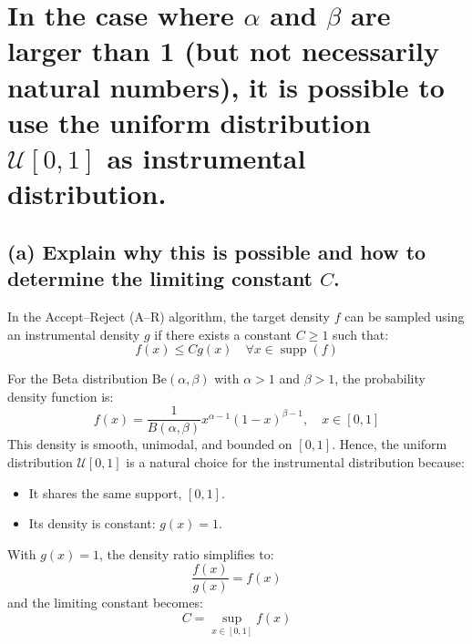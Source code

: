 \newpage


\section{In the case where $\alpha$ and $\beta$ are larger than 1 (but not necessarily natural numbers), it is possible to use the uniform distribution $\mathcal{U}[0, 1]$ as instrumental distribution.}


\subsection*{(a) Explain why this is possible and how to determine the limiting constant $C$.}

In the Accept–Reject (A–R) algorithm, the target density \(f\) can be sampled using an instrumental density \(g\) if there exists a constant \(C \geq 1\) such that:
\begin{equation}
f(x) \leq C g(x) \quad \forall x \in \operatorname{supp}(f)
\end{equation}

For the Beta distribution \(\text{Be}(\alpha, \beta)\) with \(\alpha > 1\) and \(\beta > 1\), the probability density function is:
\begin{equation}
f(x) = \frac{1}{B(\alpha, \beta)} x^{\alpha - 1} (1 - x)^{\beta - 1}, \quad x \in [0, 1]
\end{equation}
This density is smooth, unimodal, and bounded on \([0,1]\). Hence, the uniform distribution \(\mathcal{U}[0,1]\) is a natural choice for the instrumental distribution because:
\begin{itemize}
    \item It shares the same support, \([0,1]\).
    \item Its density is constant: \(g(x) = 1\).
\end{itemize}

With \(g(x) = 1\), the density ratio simplifies to:
\begin{equation}
\frac{f(x)}{g(x)} = f(x)
\end{equation}
and the limiting constant becomes:
\begin{equation}
C = \sup_{x \in [0, 1]} f(x)
\end{equation}

